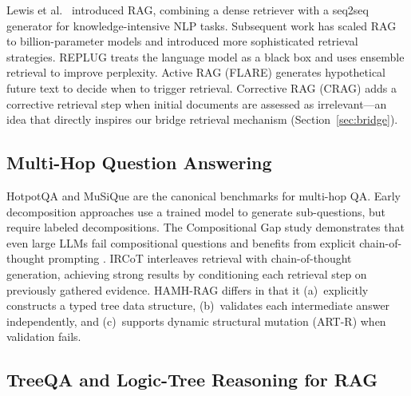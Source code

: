 \documentclass[conference]{IEEEtran}
\begin{document}
Lewis et al.~\cite{lewis2020retrieval} introduced RAG, combining a dense
retriever with a seq2seq generator for knowledge-intensive NLP tasks.
Subsequent work has scaled RAG to billion-parameter models and introduced
more sophisticated retrieval strategies.  REPLUG \cite{shi2023replug}
treats the language model as a black box and uses ensemble retrieval to
improve perplexity.  Active RAG (FLARE) \cite{jiang2023active} generates
hypothetical future text to decide when to trigger retrieval.  Corrective
RAG (CRAG) \cite{yan2024corrective} adds a corrective retrieval step when
initial documents are assessed as irrelevant---an idea that directly
inspires our bridge retrieval mechanism (Section~\ref{sec:bridge}).

\subsection{Multi-Hop Question Answering}

HotpotQA \cite{yang2018hotpotqa} and MuSiQue \cite{trivedi2022musique} are
the canonical benchmarks for multi-hop QA.  Early decomposition approaches
\cite{min2019discrete} use a trained model to generate sub-questions, but
require labeled decompositions.  The Compositional Gap study
\cite{press2023measuring} demonstrates that even large LLMs fail
compositional questions and benefits from explicit chain-of-thought prompting
\cite{wei2022chain}.  IRCoT \cite{trivedi2023interleaving} interleaves
retrieval with chain-of-thought generation, achieving strong results by
conditioning each retrieval step on previously gathered evidence.  HAMH-RAG
differs in that it (a)~explicitly constructs a typed tree data structure,
(b)~validates each intermediate answer independently, and (c)~supports
dynamic structural mutation (ART-R) when validation fails.

\subsection{TreeQA and Logic-Tree Reasoning for RAG}
\end{document}
